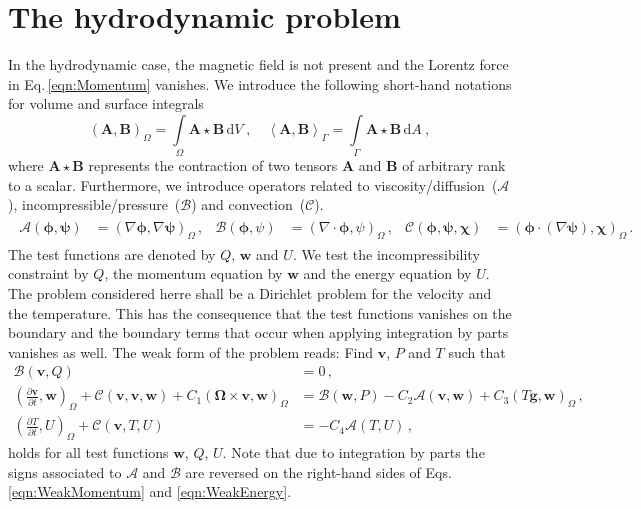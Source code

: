 \documentclass[review]{revtex4-1}
\renewcommand{\d}[1]{\ensuremath{\mathrm{d}#1} }
\newcommand{\p}{\partial}
\newcommand{\pd}[2]{\frac{\p #1}{\p #2}}
\newcommand*{\inner}[2]{\left(#1, #2\right)_{\!{\Omega}}}
\newcommand*{\innerSurf}[2]{\left\langle#1, #2\right\rangle_{\!{\Gamma}}}
\newcommand*{\elliptic}[2]{\mathcal{A}(#1, #2)}
\newcommand*{\saddle}[2]{\mathcal{B}(#1, #2)}
\newcommand*{\convec}[3]{\mathcal{C}(#1, #2, #3)}
\begin{document}
\section{The hydrodynamic problem}
In the hydrodynamic case, the magnetic field is not present and the Lorentz force in Eq.\,\eqref{eqn:Momentum} vanishes. We introduce the following short-hand notations for volume and surface integrals
\begin{equation*}
	\inner{\bm A}{\bm B} = \int\limits_{\Omega} \bm A \star \bm B\, \d V \; , \quad
	\innerSurf{\bm A}{\bm B}  = \int\limits_{\Gamma} \bm A \star \bm B\, \d A \ ,
\end{equation*}
where $\bm A \star \bm B$ represents the contraction of two tensors $\bm A$ and $\bm B$ of arbitrary rank to a scalar. Furthermore, we introduce operators related to viscosity/diffusion~($\mathcal{A}$), incompressible/pressure~($\mathcal{B}$) and convection~($\mathcal{C}$).
\begin{align*}
	\begin{aligned}
		\elliptic{\bm{\phi}}{\bm{\psi}}&=\inner{\nabla\bm{\phi}}{\nabla\bm{\psi}}\,, &
		\saddle{\bm{\phi}}{\psi}&=\inner{\nabla\cdot\bm{\phi}}{\psi}\,, &
		\convec{\bm{\phi}}{\bm{\psi}}{\bm{\chi}}&=\inner{\bm{\phi} \cdot (\nabla\bm{\psi})}{\bm{\chi}}\,.
	\end{aligned}
\end{align*}
The test functions are denoted by $Q$, $\bm{w}$ and $U$. We test the incompressibility constraint by $Q$, the momentum equation by $\bm{w}$ and the energy equation by $U$. The problem considered herre shall be a Dirichlet problem for the velocity and the temperature. This has the consequence that the test functions vanishes on the boundary and the boundary terms that occur when applying integration by parts vanishes as well. The weak form of the problem reads: Find $\bm{v}$, $P$ and $T$ such that
\begin{align}
	\saddle{\bm{v}}{Q}&=0\,,\label{eqn:WeakIncompressibility} \\
	\inner{\pd{\bm{v}}{t}}{\bm{w}}+\convec{\bm{v}}{\bm{v}}{\bm{w}}+C_1\inner{\bm{\Omega}\times\bm{v}}{\bm{w}}&=\saddle{\bm{w}}{P}-C_2\elliptic{\bm{v}}{\bm{w}}+C_3\inner{T\bm{g}}{\bm{w}}\,,\label{eqn:WeakMomentum}\\
	\inner{\pd{T}{t}}{U}+\convec{\bm{v}}{T}{U}&=-C_4\elliptic{T}{U}\,,
	\label{eqn:WeakEnergy}
\end{align}
holds for all test functions $\bm{w}$, $Q$, $U$. Note that due to integration by parts the signs associated to $\mathcal{A}$ and $\mathcal{B}$ are reversed on the right-hand sides of Eqs.\,\eqref{eqn:WeakMomentum} and \eqref{eqn:WeakEnergy}.
\end{document}
